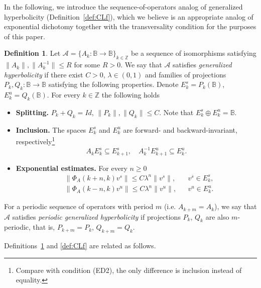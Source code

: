 \documentclass[12pt]{article}
\newcommand{\Bb}{\mathbb{B}}
\newcommand{\Zz}{\mathbb{Z}}
\theoremstyle{definition}
\newtheorem{defin}[thm]{Definition}
\newtheorem{remark}[thm]{Remark}
\begin{document}
In the following, we introduce the sequence-of-operators analog of generalized hyperbolicity (Definition~\ref{def:CLf}), which we believe is an appropriate analog of exponential dichotomy together with the transversality condition for the purposes of this paper.
\begin{defin}\label{def:CLAk}
    Let $\mathcal{A} = \{A_k: \Bb \to \Bb\}_{k \in \Zz}$ be a sequence of isomorphisms satisfying $\|A_k\|, \|A^{-1}_k\| \leq R$ for some $R>0$. We say that $\mathcal{A}$ satisfies \textit{generalized hyperbolicity} if there exist $C > 0$, $\lambda \in (0, 1)$ and  families of projections $P_k, Q_k: \Bb \to \Bb$ satisfying the following properties. Denote $E^s_k = P_k(\Bb)$, $E^u_k = Q_k(\Bb)$. For every $k \in \Zz$ the following holds
\begin{itemize}
    \item[(GH1*)] \textbf{Splitting.} $P_k + Q_k = Id$, $\|P_k\|, \|Q_k\| \leq C$. Note that $E^s_k \oplus E^u_k = \Bb$.
    \item[(GH2*)] \textbf{Inclusion.} The spaces $E^s_k$ and $E^u_k$ are forward- and backward-invariant, respectively\footnote{Compare with condition (ED2), the only difference is inclusion instead of equality.}
    $$
    A_kE^s_k \subseteq E^s_{k+1}, \quad A_k^{-1}E^u_{k+1} \subseteq E^u_{k}.
    $$
    \item[(GH3*)] 

    \textbf{Exponential estimates.}  For every $n\ge 0$    
          \begin{align*}
             &\|\Phi_A(k+n, k)  v^s\|\le C\lambda^n\|v^s\|,
               && v^s\in E^s_k, \\
             &\|\Phi_A(k-n, k) v^u\|\le C\lambda^n\|v^u\|,
               && v^u\in E^u_k.
          \end{align*}
\end{itemize}
    For a periodic sequence of operators with period $m$ (i.e. $A_{k+m} = A_k$), we say that $\mathcal{A}$ satisfies \textit{periodic generalized hyperbolicity} if projections $P_k$, $Q_k$ are also $m$-periodic, that is, $P_{k+m} = P_k$, $Q_{k+m} = Q_k$.
\end{defin}

Definitions~\ref{def:CLAk} and \ref{def:CLf} are related as follows.

\end{document}
